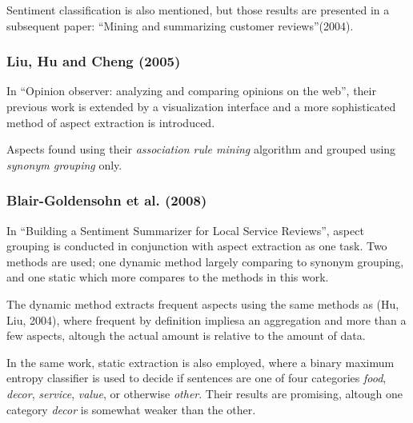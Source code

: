 \documentclass[a4paper,11pt]{kth-mag}
\begin{document}
Sentiment classification is also mentioned, but those results are presented in a subsequent paper:
``Mining and summarizing customer reviews''(2004).


\subsubsection{Liu, Hu and Cheng (2005)}
In ``Opinion observer: analyzing and comparing opinions on the web'', their previous work is extended
by a visualization interface and a more sophisticated method of aspect extraction is introduced.

%
%

Aspects found using their \emph{association rule mining}\cite{ma1998integrating} algorithm
and grouped using \emph{synonym grouping} only. %

\subsubsection{Blair-Goldensohn et al. (2008)}
In ``Building a Sentiment Summarizer for Local Service Reviews''\cite{blair2008building}, aspect grouping is
conducted in conjunction with aspect extraction as one task.
Two methods are used; one dynamic method largely comparing to synonym grouping,
and one static which more compares to the methods in this work.

The dynamic method extracts frequent aspects using the same methods as (Hu, Liu, 2004),
where frequent by definition impliesa an aggregation and more than a few aspects,
altough the actual amount is relative to the amount of data.

In the same work, static extraction is also employed, where a binary maximum entropy classifier
is used to decide if sentences are one of four categories \emph{food}, \emph{decor}, \emph{service}, \emph{value},
or otherwise \emph{other}.
Their results are promising, altough one category \emph{decor} is somewhat weaker than the other.
\end{document}
